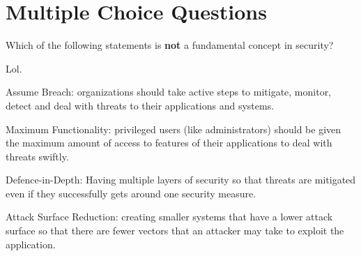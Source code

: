 \documentclass[tut]{yqteach}
\begin{document}
\maketitle


\section*{Multiple Choice Questions}


 Which of the following statements is \textbf{not} a fundamental concept in security?

\sq Lol.
\begin{letteroptions}
    \item Assume Breach: organizations should take active steps to mitigate, monitor, detect and deal with threats to their applications and systems.
    \item Maximum Functionality: privileged users (like administrators) should be given the maximum amount of access to features of their applications to deal with threats swiftly.
    \item Defence-in-Depth: Having multiple layers of security so that threats are mitigated even if they successfully gets around one security measure.
    \item Attack Surface Reduction: creating smaller systems that have a lower attack surface so that there are fewer vectors that an attacker may take to exploit the application.
\end{letteroptions}


\endofdocument
\end{document}
